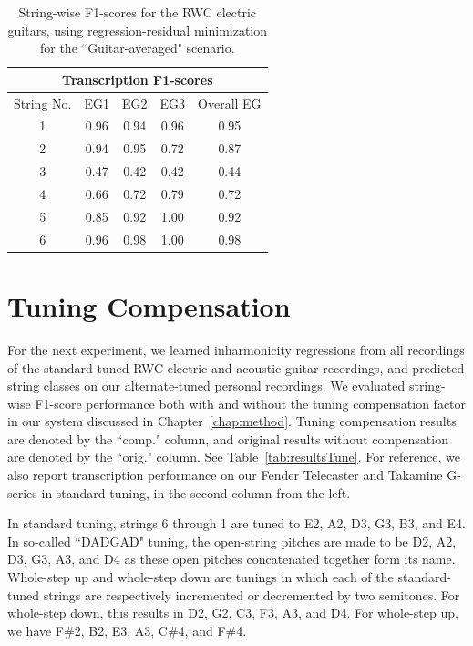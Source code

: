 \documentclass[12pt]{cmuthesis}
\begin{document}
\begin{table}[!htbp]
\begin{center}
\begin{tabular}{||c||c|c|c|c||}
\hline
\multicolumn{5}{||c||}{\bf{Transcription F1-scores}} \\
\hline
String No. & EG1 & EG2 & EG3 & Overall EG\\
\hline
1 & 0.96 & 0.94 & 0.96 & 0.95 \\
\hline
2 & 0.94 & 0.95 & 0.72 & 0.87\\
\hline
3 & 0.47 & 0.42 & 0.42 &  0.44\\
\hline
4 & 0.66 & 0.72 & 0.79 &  0.72\\
\hline
5 & 0.85 & 0.92 & 1.00 &  0.92 \\
\hline
6 & 0.96 & 0.98 & 1.00 &  0.98 \\ 
\hline
\hline
\end{tabular}
\caption{String-wise F1-scores for the RWC electric guitars, using regression-residual minimization for the ``Guitar-averaged" scenario.} 
\label{tab:eg-str-f}
\end{center}
\end{table}

\section{Tuning Compensation}
For the next experiment, we learned inharmonicity regressions from all recordings of the standard-tuned RWC electric and acoustic guitar recordings, and predicted string classes on our alternate-tuned personal recordings. We evaluated string-wise F1-score performance both with and without the tuning compensation factor in our system discussed in Chapter~\ref{chap:method}. Tuning compensation results are denoted by the ``comp." column, and original results without compensation are denoted by the ``orig." column. See Table~\ref{tab:resultsTune}. For reference, we also report transcription performance on our Fender Telecaster and Takamine G-series in standard tuning, in the second column from the left.

In standard tuning, strings 6 through 1 are tuned to E2, A2, D3, G3, B3, and E4. In so-called ``DADGAD" tuning, the open-string pitches are made to be D2, A2, D3, G3, A3, and D4 as these open pitches concatenated together form its name. Whole-step up and whole-step down are tunings in which each of the standard-tuned strings are respectively incremented or decremented by two semitones. For whole-step down, this results in D2, G2, C3, F3, A3, and D4. For whole-step up, we have F\#2, B2, E3, A3, C\#4, and F\#4.
\end{document}
